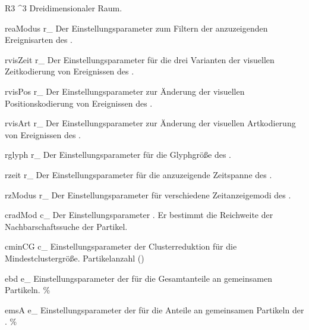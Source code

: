 %

\glossarysymbol%
	{R3}%
	{^3}%
	{Dreidimensionaler Raum.}
	{\emptyset}

\glossarysymbol%
	{reaModus}%
	{r_}%
	{Der Einstellungsparameter zum Filtern der anzuzeigenden Ereignisarten des .}%
	{\emptyset}

\glossarysymbol%
	{rvisZeit}%
	{r_}%
	{Der Einstellungsparameter für die drei Varianten der visuellen Zeitkodierung von Ereignissen des .}%
	{\emptyset}

\glossarysymbol%
	{rvisPos}%
	{r_}%
	{Der Einstellungsparameter zur Änderung der visuellen Positionskodierung von Ereignissen des .}%
	{\emptyset}

\glossarysymbol%
	{rvisArt}%
	{r_}%
	{Der Einstellungsparameter zur Änderung der visuellen Artkodierung von Ereignissen des .}%
	{\emptyset}

\glossarysymbol%
	{rglyph}%
	{r_}%
	{Der Einstellungsparameter für die Glyphgröße des .}%
	{\emptyset}

\glossarysymbol%
	{rzeit}%
	{r_}%
	{Der Einstellungsparameter für die anzuzeigende Zeitspanne des .}%
	{\emptyset}

\glossarysymbol%
	{rzModus}%
	{r_}%
	{Der Einstellungsparameter für verschiedene Zeitanzeigemodi des .}%
	{\emptyset}

\glossarysymbol%
	{cradMod}%
	{c_}%
	{Der Einstellungsparameter . Er bestimmt die Reichweite der Nachbarschaftssuche der Partikel.}%
	{\emptyset}

\glossarysymbol%
	{cminCG}%
	{c_}%
	{Einstellungsparameter der Clusterreduktion für die Mindestclustergröße.}%
	{Partikelanzahl (\emptyset)}

\glossarysymbol%
	{ebd}%
	{e_}%
	{Einstellungsparameter der  für die Gesamtanteile an gemeinsamen Partikeln.}%
	{\%}

\glossarysymbol%
	{emsA}%
	{e_}%
	{Einstellungsparameter der  für die Anteile an gemeinsamen Partikeln der .}%
	{\%}
	
